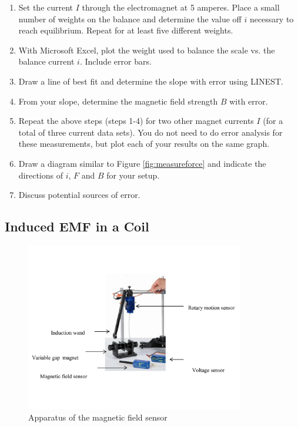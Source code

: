 \begin{enumerate}
  \item Set the current $I$ through the electromagnet at 5 amperes. Place a small number of weights on the balance and determine the value off $i$ necessary to reach equilibrium. Repeat for at least five different weights.

  \item With Microsoft Excel, plot the weight used to balance the scale vs. the balance current $i$. Include error bars.

  \item Draw a line of best fit and determine the slope with error using LINEST.

  \item From your slope, determine the magnetic field strength $B$ with error.

  \item Repeat the above steps (steps 1-4)  for two other magnet currents $I$ (for a total of three current data sets). You do not need to do error analysis for these measurements, but plot each of your results on the same graph.

  \item Draw a diagram similar to Figure \ref{fig:measureforce} and indicate the directions of $i$, $F$ and $B$ for your setup.

  \item Discuss potential sources of error.
\end{enumerate}

\subsection{Induced EMF in a Coil}

\begin{figure}[h]
\centering
\includegraphics[width=0.85\textwidth]{./Exp4/pic/emf_setup.png}
\caption{Apparatus of the magnetic field sensor}
\label{fig:emfsetup}
\end{figure}

